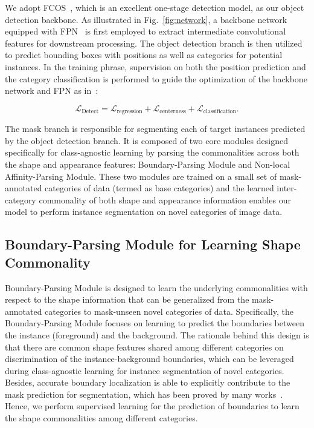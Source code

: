 \documentclass[runningheads]{llncs}
\begin{document}
We adopt FCOS~\cite{tian2019fcos}, which is an excellent one-stage detection model, as our object detection backbone. As illustrated in Fig.~\ref{fig:network}, a backbone network equipped with FPN~\cite{lin2017feature} is first employed to extract intermediate convolutional features for downstream processing. The object detection branch is then utilized to predict bounding boxes with positions as well as categories for potential instances. In the training phrase, supervision on both the position prediction and the category classification is performed to guide the optimization of the backbone network and FPN as in~\cite{tian2019fcos}:
\begin{small}
\vspace{-2mm}
\begin{equation}
    \mathcal{L}_{\text{Detect}} = \mathcal{L}_{\text{regression}} + \mathcal{L}_{\text{centerness}} + \mathcal{L}_{\text{classification}}.
\end{equation}
\end{small}
\vspace{-0.25in}

The mask branch is responsible for segmenting each of target instances predicted by the object detection branch. It is composed of two core modules designed specifically for class-agnostic learning by parsing the commonalities across both the shape and appearance features: Boundary-Parsing Module and Non-local Affinity-Parsing Module. These two modules are trained on a small set of mask-annotated categories of data (termed as base categories) and the learned inter-category commonality of both shape and appearance information enables our model to perform instance segmentation on novel categories of image data.  

\vspace{-2mm}
\subsection{Boundary-Parsing Module for Learning Shape Commonality}
\vspace{-1mm}
Boundary-Parsing Module is designed to learn the underlying commonalities with respect to the shape information that can be generalized from the mask-annotated categories to mask-unseen novel categories of data. Specifically, the Boundary-Parsing Module focuses on learning to predict the boundaries between the instance (foreground) and the background. The rationale behind this design is that there are common shape features shared among different categories on discrimination of the instance-background boundaries, which can be leveraged during class-agnostic learning for instance segmentation of novel categories. Besides, accurate boundary localization is able to explicitly contribute to the mask prediction for segmentation, which has been proved by many works~\cite{arbelaez2009contours,arbelaez2010contour,bertasius2015high,chen2016semantic,ding2019boundary,luo2017non,qin2019basnet,wang2019salient,yu2018learning,zhao2019egnet}.
Hence, we perform supervised learning for the prediction of boundaries to learn the shape commonalities among different categories.  
\end{document}
